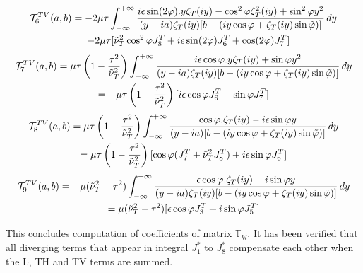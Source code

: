 \begin{multline}
\mathcal{T}_6^{TV}(a,b)=-2\mu\tau\int_{-\infty}^{+\infty} \frac{ i\epsilon\sin(2\varphi).y\zeta_T(iy)- \cos^2\varphi \zeta_T^2(iy)+ \sin^2\varphi y^2}{(y-ia)\zeta_T(iy)\lbrack b- (iy\cos \varphi+\zeta_T(iy)\sin\phiti) \rbrack} \, dy\\
\hfill=-2\mu\tau \lbrack \nuti_T^2\cos^2\varphi J_8^T+i\epsilon\sin(2\varphi)J_6^T+\cos(2\varphi)J_7^T \rbrack \hfill
\end{multline}
\begin{multline}
\mathcal{T}_7^{TV}(a,b)=\mu\tau\left(1-\frac{\tau^2}{\nuti_T^2}\right)\int_{-\infty}^{+\infty} \frac{ i\epsilon\cos\varphi.y\zeta_T(iy)+ \sin\varphi y^2}{(y-ia)\zeta_T(iy)\lbrack b- (iy\cos \varphi+\zeta_T(iy)\sin\phiti) \rbrack} \, dy \\
\hfill =-\mu\tau\left(1-\frac{\tau^2}{\nuti_T^2}\right) \lbrack i\epsilon\cos\varphi J_6^T-\sin\varphi J_7^T \rbrack \hfill
\end{multline}
\begin{multline}
\mathcal{T}_8^{TV}(a,b)=\mu\tau\left(1-\frac{\tau^2}{\nuti_T^2}\right)\int_{-\infty}^{+\infty} \frac{ \cos\varphi.\zeta_T(iy)-i\epsilon \sin\varphi y}{(y-ia)\lbrack b- (iy\cos \varphi+\zeta_T(iy)\sin\phiti) \rbrack} \, dy\\
\hfill=\mu\tau \left(1-\frac{\tau^2}{\nuti_T^2}\right)\lbrack\cos\varphi (J_7^T+\nuti_T^2J_8^T) +i\epsilon\sin\varphi J_6^T \rbrack \hfill
\end{multline}
\begin{multline}
\mathcal{T}_9^{TV}(a,b)=-\mu(\nuti_T^2-\tau^2)\int_{-\infty}^{+\infty} \frac{ \epsilon\cos\varphi.\zeta_T(iy)- i\sin\varphi y}{(y-ia)\zeta_T(iy)\lbrack b- (iy\cos \varphi+\zeta_T(iy)\sin\phiti) \rbrack} \, dy\\
\hfill=\mu(\nuti_T^2-\tau^2)\lbrack \epsilon\cos\varphi J_3^T+i\sin\varphi  J_5^T \rbrack \hfill
\end{multline}

This concludes computation of coefficients of matrix $\mathbb{T}_{kl}$. It has been verified that all diverging terms that appear in integral $J_1^*$ to $J_8^*$ compensate each other when the L, TH and TV terms are summed.
